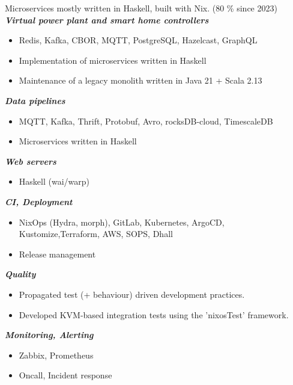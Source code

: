 \documentclass[11pt,a4paper,ngerman,sans]{moderncv}
\begin{document}
{
  Microservices mostly written in Haskell, built with Nix.\newline
  (80 \% since 2023)\newline
  \\
	\textbf{\emph{Virtual power plant and smart home controllers}\newline}
  \begin{itemize}
    \item Redis, Kafka, CBOR, MQTT, PostgreSQL, Hazelcast, GraphQL
    \item Implementation of microservices written in Haskell
    \item Maintenance of a legacy monolith written in Java 21 + Scala 2.13
    \\
  \end{itemize}
	\textbf{\emph{Data pipelines}\newline}
  \begin{itemize}
    \item MQTT, Kafka, Thrift, Protobuf, Avro, rocksDB-cloud, TimescaleDB
    \item Microservices written in Haskell
    \\
  \end{itemize}
	\textbf{\emph{Web servers}\newline}
  \begin{itemize}
    \item Haskell (wai/warp)
    \\
  \end{itemize}
	\textbf{\emph{CI, Deployment}\newline}
  \begin{itemize}
    \item NixOps (Hydra, morph), GitLab, Kubernetes, ArgoCD, Kustomize,\newline Terraform, AWS, SOPS, Dhall
    \item Release management
    \\
  \end{itemize}
	\textbf{\emph{Quality}\newline}
  \begin{itemize}
    \item Propagated test (+ behaviour) driven development practices.
    \item Developed KVM-based integration tests using the 'nixosTest' framework.
    \\
  \end{itemize}
	\textbf{\emph{Monitoring, Alerting}\newline}
  \begin{itemize}
    \item Zabbix, Prometheus
    \item Oncall, Incident response
    \\
  \end{itemize}
}
\end{document}

